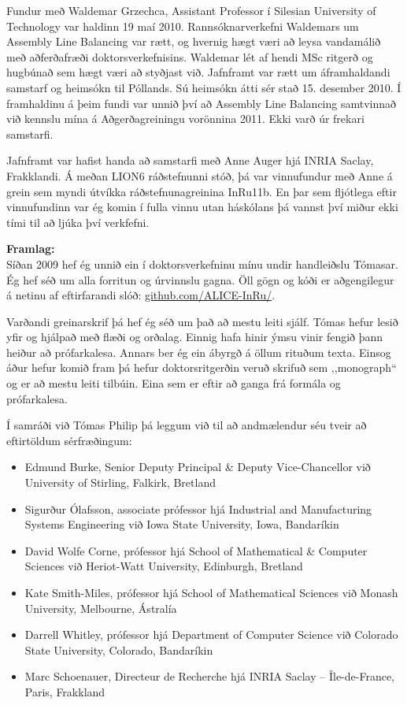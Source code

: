 \documentclass{cover}
\newcommand{\mycaption}[1]{{\bfseries #1:}\\}
\begin{document}
{\begin{itemize}
\end{itemize}

Fundur með Waldemar Grzechca, Assistant Professor í Silesian University
of Technology var haldinn 19 maí 2010. Rannsóknarverkefni Waldemars um Assembly 
Line Balancing var rætt, og hvernig hægt væri að leysa vandamálið
með aðferðafræði doktorsverkefnisins. 
Waldemar lét af hendi MSc ritgerð og hugbúnað sem hægt væri að styðjast við. 
Jafnframt var rætt um áframhaldandi samstarf og heimsókn til Póllands. 
Sú heimsókn átti sér stað 15. desember 2010. 
Í framhaldinu á þeim fundi var unnið því að Assembly Line Balancing samtvinnað 
við kennslu mína á Aðgerðagreiningu vorönnina 2011.
Ekki varð úr frekari samstarfi. 

Jafnframt var hafist handa að samstarfi með Anne Auger hjá INRIA Saclay, 
Frakklandi. 
Á meðan LION6 ráðstefnunni stóð, þá var vinnufundur með Anne á grein sem myndi 
útvíkka ráðstefnunagreinina InRu11b. 
En þar sem fljótlega eftir vinnufundinn var ég komin í fulla vinnu utan 
háskólans þá vannst því miður ekki tími til að ljúka því verkfefni.

\mycaption{Framlag}
Síðan 2009 hef ég unnið ein í doktorsverkefninu mínu undir handleiðslu Tómasar. 
Ég hef séð um alla forritun og úrvinnslu gagna. Öll gögn og kóði er 
aðgengilegur á netinu af eftirfarandi slóð: \url{github.com/ALICE-InRu/}.

Varðandi greinarskrif þá hef ég séð um það að mestu leiti sjálf. Tómas hefur 
lesið yfir og hjálpað með flæði og orðalag. Einnig hafa hinir ýmsu vinir fengið 
þann heiður að prófarkalesa. Annars ber ég ein ábyrgð á öllum rituðum texta.
Einsog áður hefur komið fram þá hefur doktorsritgerðin veruð skrifuð sem 
,,monograph`` og er að mestu leiti tilbúin. Eina sem er eftir að ganga frá 
formála og prófarkalesa. 

\clearpage
Í samráði við Tómas Philip þá leggum við til að andmælendur séu tveir að 
eftirtöldum sérfræðingum:

\begin{itemize} 
    \item Edmund Burke, Senior Deputy Principal \& Deputy Vice-Chancellor við  
    University of Stirling, Falkirk, Bretland
    \item Sigurður Ólafsson, associate prófessor hjá Industrial and 
    Manufacturing Systems Engineering við Iowa State University, Iowa, 
    Bandaríkin
    \item David Wolfe Corne, prófessor hjá School of Mathematical \& Computer 
    Sciences við Heriot-Watt University, Edinburgh, Bretland
    \item Kate Smith-Miles, prófessor hjá School of Mathematical Sciences við 
    Monash University, Melbourne, Ástralía
    \item Darrell Whitley, prófessor hjá Department of Computer Science við  
    Colorado State University, Colorado, Bandaríkin
    \item Marc Schoenauer, Directeur de Recherche hjá INRIA Saclay -- 
    Île-de-France, Paris, Frakkland
\end{itemize}

}
\end{document}
